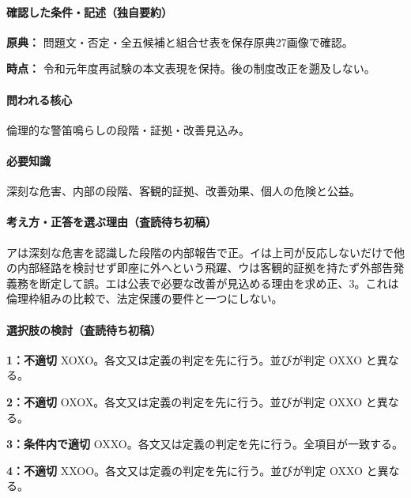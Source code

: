 \paragraph{確認した条件・記述（独自要約）}\mbox{}\par

\noindent\textbf{原典：} 問題文・否定・全五候補と組合せ表を保存原典27画像で確認。\par

\noindent\textbf{時点：} 令和元年度再試験の本文表現を保持。後の制度改正を遡及しない。\par

\paragraph{問われる核心} 倫理的な警笛鳴らしの段階・証拠・改善見込み。

\paragraph{必要知識} 深刻な危害、内部の段階、客観的証拠、改善効果、個人の危険と公益。

\paragraph{考え方・正答を選ぶ理由（査読待ち初稿）} アは深刻な危害を認識した段階の内部報告で正。イは上司が反応しないだけで他の内部経路を検討せず即座に外へという飛躍、ウは客観的証拠を持たず外部告発義務を断定して誤。エは公表で必要な改善が見込める理由を求め正、3。これは倫理枠組みの比較で、法定保護の要件と一つにしない。

\paragraph{選択肢の検討（査読待ち初稿）}\mbox{}\par

\noindent\textbf{1：不適切} XOXO。各文又は定義の判定を先に行う。並びが判定 OXXO と異なる。\par

\noindent\textbf{2：不適切} OXOX。各文又は定義の判定を先に行う。並びが判定 OXXO と異なる。\par

\noindent\textbf{3：条件内で適切} OXXO。各文又は定義の判定を先に行う。全項目が一致する。\par

\noindent\textbf{4：不適切} XXOO。各文又は定義の判定を先に行う。並びが判定 OXXO と異なる。\par

